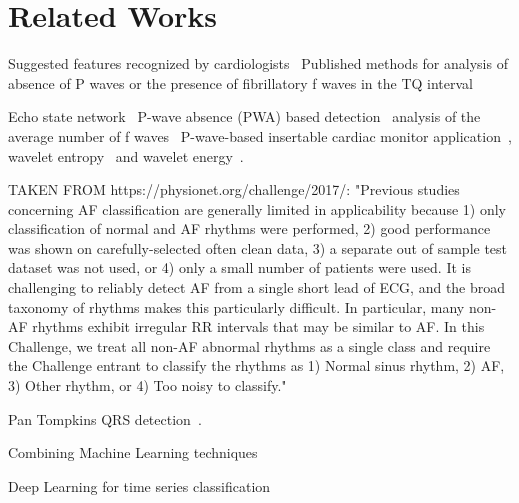 \section{Related Works}


Suggested features recognized by cardiologists~\cite{reiffel2010practice}
Published methods for analysis of absence of P waves or the presence of fibrillatory f waves in the TQ interval

Echo state network~\cite{petrenas2012echo}
P-wave absence (PWA) based detection~\cite{ladavich2015rate}
analysis of the average number of f waves~\cite{du2014novel}
P-wave-based insertable cardiac monitor application~\cite{purerfellner2014p},
wavelet entropy~\cite{alcaraz2006wavelet, rodenas2015wavelet} and wavelet energy~\cite{garcia2016application}.

TAKEN FROM https://physionet.org/challenge/2017/:
"Previous studies concerning AF classification are generally limited in applicability because 1) only classification of normal and AF rhythms were performed, 2) good performance was shown on carefully-selected often clean data, 3) a separate out of sample test dataset was not used, or 4) only a small number of patients were used. It is challenging to reliably detect AF from a single short lead of ECG, and the broad taxonomy of rhythms makes this particularly difficult. In particular, many non-AF rhythms exhibit irregular RR intervals that may be similar to AF. In this Challenge, we treat all non-AF abnormal rhythms as a single class and require the Challenge entrant to classify the rhythms as 1) Normal sinus rhythm, 2) AF, 3) Other rhythm, or 4) Too noisy to classify."

Pan Tompkins QRS detection~\cite{waser2013removing}.

Combining Machine Learning techniques~\cite{geurts2001pattern}

Deep Learning for time series classification~\cite{langkvist2014review, wang2016time}
